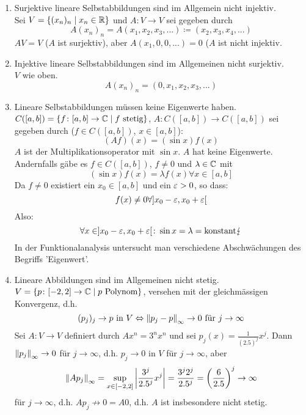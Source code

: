 \begin{enumerate}
\item Surjektive lineare Selbstabbildungen sind im Allgemein nicht injektiv.\\
Sei $ V=\lbrace(x_n)_n\mid x_n\in\mathbb{R}\rbrace $ und $ A\colon V\rightarrow V $ sei gegeben durch
\[ A(x_n)_n=A(x_1,x_2,x_3,...)\coloneqq(x_2,x_3,x_4,...) \]
$ AV=V $ ($ A $ ist surjektiv), aber $ A(x_1,0,0,...)=0$ ($ A $ ist nicht injektiv.
\item Injektive lineare Selbstabbildungen sind im Allgemeinen nicht surjektiv.\\
$ V $ wie oben.
\[ A(x_n)_n=(0,x_1,x_2,x_3,...) \]
\item Lineare Selbstabbildungen m\"ussen keine Eigenwerte haben.\\
$ C([a,b])=\lbrace f\colon[a,b]\rightarrow\mathbb{C}\mid f\text{ stetig}\rbrace $, $ A\colon C([a,b])\rightarrow C([a,b]) $ sei gegeben durch ($ f\in C([a,b]) $, $ x\in[a,b] $):
\[ (Af)(x)=(\sin x)f(x) \]
$ A $ ist der Multiplikationsoperator mit $ \sin x $. $ A $ hat keine Eigenwerte. Andernfalls g\"abe es $ f\in C([a,b]) $, $ f\neq 0 $ und $ \lambda\in\mathbb{C} $ mit
\[ (\sin x)f(x)=\lambda f(x)\forall x\in[a,b] \]
Da $ f\neq 0 $ existiert ein $ x_0\in[a,b] $ und ein $ \varepsilon>0 $, so dass:
\[ f(x)\neq 0\forall ]x_0-\varepsilon,x_0+\varepsilon[ \]
Also:
\[ \forall x\in]x_0-\varepsilon,x_0+\varepsilon[\colon \sin x=\lambda=\text{konstant}\lightning \]
In der Funktionalanalysis untersucht man verschiedene Abschw\"achungen des Begriffs 'Eigenwert'.
\item Lineare Abbildungen sind im Allgemeinen nicht stetig.\\
$ V=\lbrace p\colon[-2,2]\rightarrow\mathbb{C}\mid p\text{ Polynom}\rbrace $, versehen mit der gleichm\"assigen Konvergenz, d.h. \[(p_j)_j\to p  \text{ in }  V \Leftrightarrow \left\|p_j-p\right\|_\infty\to 0\text{ f\"ur }j\to\infty\]
Sei $ A\colon V\rightarrow V $ definiert durch $ Ax^n=3^nx^n $ und sei $ p_j(x)=\frac{1}{(2.5)^j}x^j $. Dann $ \left\|p_j\right\|_\infty\to 0 $ f\"ur $ j\to\infty $, d.h. $ p_j\to 0 $ in $ V $ f\"ur $ j\to\infty $, aber
\[ \left\|Ap_j\right\|_\infty=\sup_{x\in[-2,2]}\left|\frac{3^j}{2.5^j}x^j\right|=\frac{3^j2^j}{2.5^j}=\left(\frac{6}{2.5}\right)^j\to\infty \] f\"ur $ j\to\infty $, d.h. $ Ap_j\not\rightarrow 0=A0 $, d.h. $ A $ ist insbesondere nicht stetig.
\end{enumerate}